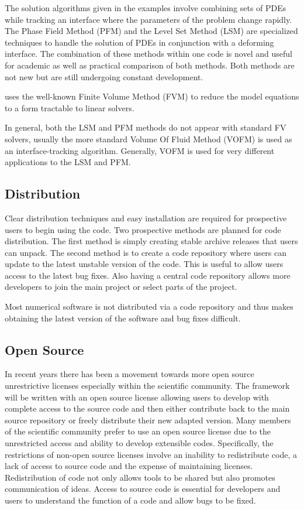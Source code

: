 The solution algorithms given in the \FiPy{} examples involve combining
sets of PDEs while tracking an interface where the parameters of the
problem change rapidly. The Phase Field Method (PFM) and the Level Set
Method (LSM) are specialized techniques to handle the solution of
PDEs in conjunction with a deforming interface. The combination of
these methods within one code is novel and useful for academic as well
as practical comparison of both methods. Both methods are not new but
are still undergoing constant development.

\FiPy{} uses the well-known Finite Volume Method (FVM) to reduce the
model equations to a form tractable to linear solvers.

In general, both the LSM and PFM methods do not appear with standard
FV solvers, usually the more standard Volume Of Fluid Method (VOFM) is
used as an interface-tracking algorithm. Generally, VOFM is used for
very different applications to the LSM and PFM.

\subsection{Distribution}

Clear distribution techniques and easy installation are required for
prospective users to begin using the code. Two prospective methods are
planned for code distribution. The first method is simply creating
stable archive releases that users can unpack. The second method is to
create a code repository where users can update to the latest unstable
version of the code. This is useful to allow users access to the
latest bug fixes. Also having a central code repository allows more
developers to join the main project or select parts of the project.

Most numerical software is not distributed via a code repository and
thus makes obtaining the latest version of the software and bug fixes
difficult.

\subsection{Open Source}

In recent years there has been a movement towards more open source
unrestrictive licenses especially within the scientific community. The
\FiPy{} framework will be written with an open source license allowing
users to develop with complete access to the source code and then
either contribute back to the main source repository or freely
distribute their new adapted version. Many members of the scientific
community prefer to use an open source license due to the unrestricted
access and ability to develop extensible codes. Specifically, the
restrictions of non-open source licenses involve an inability to
redistribute code, a lack of access to source code and the expense of
maintaining licenses. Redistribution of code not only allows tools to
be shared but also promotes communication of ideas. Access to source
code is essential for developers and users to understand the function
of a code and allow bugs to be fixed.

